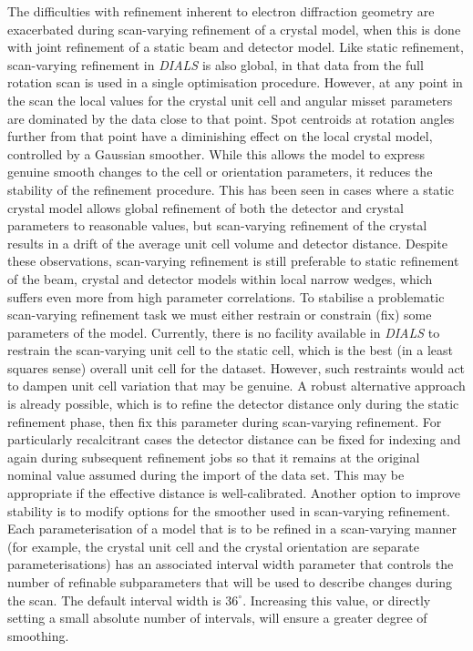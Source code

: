 \documentclass[preprint]{iucr}
\newcommand{\dials}{\emph{DIALS}\xspace}
\begin{document}
The difficulties with refinement inherent to electron diffraction geometry are
exacerbated during scan-varying refinement of a crystal model, when this is
done with joint refinement of a static beam and detector model. Like static
refinement, scan-varying refinement in \dials is also global, in that data from
the full rotation scan is used in a single optimisation procedure. However, at
any point in the scan the local values for the crystal unit cell and angular
misset parameters are dominated by the data close to that point. Spot centroids
at rotation angles further from that point have a diminishing effect on the
local crystal model, controlled by a Gaussian smoother. While this allows the
model to express genuine smooth changes to the cell or orientation parameters,
it reduces the stability of the refinement procedure. This has been seen in
cases where a static crystal model allows global refinement of both the
detector and crystal parameters to reasonable values, but scan-varying
refinement of the crystal results in a drift of the average unit cell volume
and detector distance. Despite these observations, scan-varying refinement is
still preferable to static refinement of the beam, crystal and detector models
within local narrow wedges, which suffers even more from high parameter
correlations. To stabilise a problematic scan-varying refinement task we must
either restrain or constrain (fix) some parameters of the model. Currently,
there is no facility available in \dials to restrain the scan-varying unit cell
to the static cell, which is the best (in a least squares sense) overall unit
cell for the dataset. However, such restraints would act to dampen unit cell
variation that may be genuine. A robust alternative approach is already
possible, which is to refine the detector distance only during the static
refinement phase, then fix this parameter during scan-varying refinement. For
particularly recalcitrant cases the detector distance can be fixed for indexing
and again during subsequent refinement jobs so that it remains at the original
nominal value assumed during the import of the data set. This may be
appropriate if the effective distance is well-calibrated. Another option to
improve stability is to modify options for the smoother used in scan-varying
refinement. Each parameterisation of a model that is to be refined in a
scan-varying manner (for example, the crystal unit cell and the crystal
orientation are separate parameterisations) has an associated interval width
parameter that controls the number of refinable subparameters that will be used
to describe changes during the scan. The default interval width is $36^\circ$.
Increasing this value, or directly setting a small absolute number of
intervals, will ensure a greater degree of smoothing.
\end{document}
